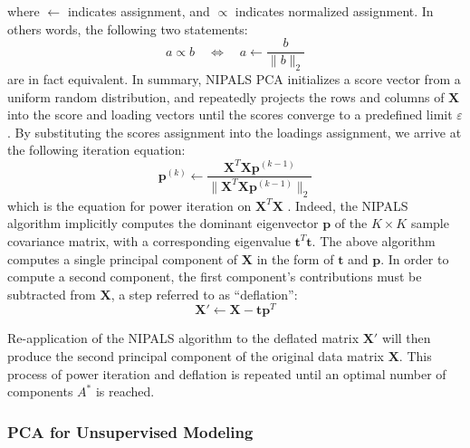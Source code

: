 \begin{doublespace}
where $\gets$ indicates assignment, and $\propto$ indicates normalized
assignment. In others words, the following two statements:
\begin{equation*}
a \propto b \quad \Leftrightarrow \quad a \gets \frac{b}{\|b\|_2}
\end{equation*}
are in fact equivalent. In summary, NIPALS PCA initializes a score vector from
a uniform random distribution, and repeatedly projects the rows and columns of
$\mathbf{X}$ into the score and loading vectors until the scores converge to
a predefined limit $\varepsilon$. By substituting the scores assignment into
the loadings assignment, we arrive at the following iteration equation:
\begin{equation}
\mathbf{p}^{(k)} \gets
 \frac
  {\mathbf{X}^T \mathbf{X} \mathbf{p}^{(k-1)}}
  {\| \mathbf{X}^T \mathbf{X} \mathbf{p}^{(k-1)} \|_2}
\end{equation}
which is the equation for power iteration on $\mathbf{X}^T \mathbf{X}$
\cite{golub2012}. Indeed, the NIPALS algorithm implicitly computes the
dominant eigenvector $\mathbf{p}$ of the $K \times K$ sample covariance
matrix, with a corresponding eigenvalue $\mathbf{t}^T \mathbf{t}$. The above
algorithm computes a single principal component of $\mathbf{X}$ in the form
of $\mathbf{t}$ and $\mathbf{p}$. In order to compute a second component,
the first component's contributions must be subtracted from $\mathbf{X}$,
a step referred to as ``deflation'':
\begin{equation}
\mathbf{X}' \gets \mathbf{X} - \mathbf{t} \mathbf{p}^T
\end{equation}

Re-application of the NIPALS algorithm to the deflated matrix $\mathbf{X}'$
will then produce the second principal component of the original data matrix
$\mathbf{X}$. This process of power iteration and deflation is repeated until
an optimal number of components $A^\ast$ is reached.
\end{doublespace}

\subsubsection{PCA for Unsupervised Modeling}

